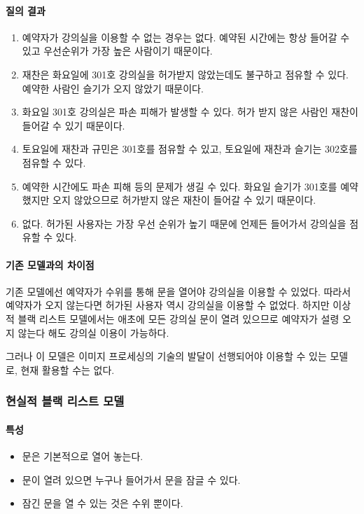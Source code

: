 \documentclass[11pt,a4paper]{article}
\begin{document}
\paragraph{질의 결과}
\begin{enumerate}
\item 예약자가 강의실을 이용할 수 없는 경우는 없다. 예약된 시간에는 항상 들어갈
수 있고 우선순위가 가장 높은 사람이기 때문이다.
\item 재찬은 화요일에 301호 강의실을 허가받지 않았는데도 불구하고 점유할 수
있다. 예약한 사람인 슬기가 오지 않았기 때문이다.
\item 화요일 301호 강의실은 파손 피해가 발생할 수 있다. 허가 받지 않은 사람인
재찬이 들어갈 수 있기 때문이다.
\item 토요일에 재찬과 규민은 301호를 점유할 수 있고, 토요일에 재찬과 슬기는
302호를 점유할 수 있다.
\item 예약한 시간에도 파손 피해 등의 문제가 생길 수 있다. 화요일 슬기가 301호를
예약했지만 오지 않았으므로 허가받지 않은 재찬이 들어갈 수 있기 때문이다.
\item 없다. 허가된 사용자는 가장 우선 순위가 높기 때문에 언제든 들어가서
강의실을 점유할 수 있다.
\end{enumerate}

\paragraph{기존 모델과의 차이점}
\hfill\break
기존 모델에선 예약자가 수위를 통해 문을 열어야 강의실을 이용할 수 있었다.
따라서 예약자가 오지 않는다면 허가된 사용자 역시 강의실을 이용할 수 없었다.
하지만 이상적 블랙 리스트 모델에서는 애초에 모든 강의실 문이 열려 있으므로
예약자가 설령 오지 않는다 해도 강의실 이용이 가능하다.

그러나 이 모델은 이미지 프로세싱의 기술의 발달이 선행되어야 이용할 수 있는
모델로, 현재 활용할 수는 없다.

\subsubsection{현실적 블랙 리스트 모델}

\paragraph{특성}
\begin{itemize}
\item 문은 기본적으로 열어 놓는다.
\item 문이 열려 있으면 누구나 들어가서 문을 잠글 수 있다.
\item 잠긴 문을 열 수 있는 것은 수위 뿐이다.
\end{itemize}
\end{document}
